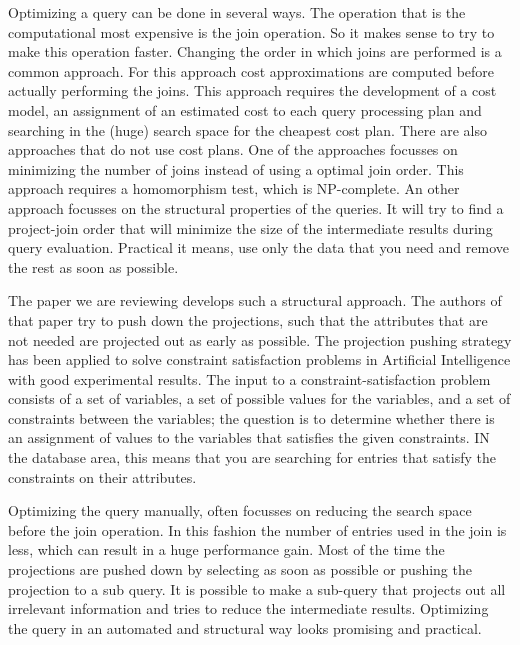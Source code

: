 Optimizing a query can be done in several ways. The operation that is the computational most expensive is the join operation. So it makes sense to try to make this operation faster. Changing the order in which joins are performed is a common approach. For this approach cost approximations are computed before actually performing the joins. This approach requires  the development of a cost model, an assignment of an estimated cost to each query processing plan and searching in the (huge) search space for the cheapest cost plan. There are also approaches that do not use cost plans. One of the approaches focusses on minimizing the number of joins instead of using a optimal join order. This approach requires a homomorphism test, which is NP-complete. An other approach focusses on the structural properties of the queries. It will try to find a project-join order that will minimize the size of the intermediate results during query evaluation. Practical it means, use only the data that you need and remove the rest as soon as possible. 

The paper \cite{paper} we are reviewing develops such a structural approach. The authors of that paper try to push down the projections, such that the attributes that are not needed are projected out as early as possible. The projection pushing strategy has been applied to solve constraint satisfaction problems in Artificial Intelligence with good experimental results. The input to a constraint-satisfaction problem consists of a set of variables, a set of possible values for the variables, and a set of constraints between the variables; the question is to determine whether there is an assignment of values to the variables that satisfies the given constraints. IN the database area, this means that you are searching for entries that satisfy the constraints on their attributes. 

Optimizing the query manually, often focusses on reducing the search space before the join operation. In this fashion the number of entries used in the join is less, which can result in a huge performance gain. Most of the time the projections are pushed down by selecting as soon as possible or pushing the projection to a sub query. It is possible to make a sub-query that projects out all irrelevant information and tries to reduce the intermediate results. Optimizing the query in an automated and structural way looks promising and practical. 